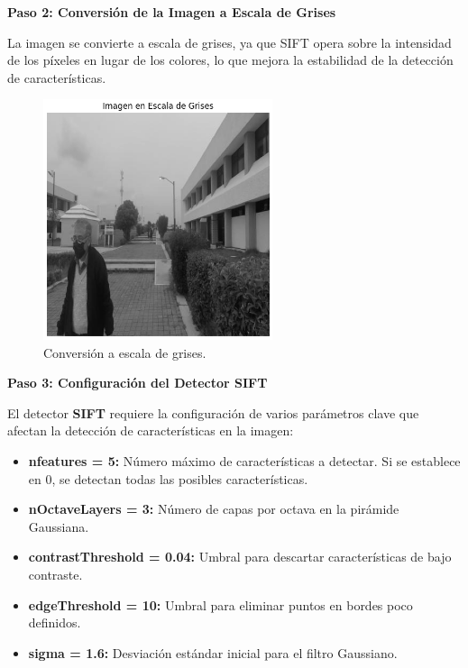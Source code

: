 \documentclass[a4paper]{article}
\begin{document}
\textbf{Paso 2: Conversión de la Imagen a Escala de Grises}

La imagen se convierte a escala de grises, ya que SIFT opera sobre la intensidad de los píxeles en lugar de los colores, lo que mejora la estabilidad de la detección de características.

\begin{figure}[H]
    \centering
    \includegraphics[width=0.6\textwidth]{images/sift_paso_2.png}
    \caption{Conversión a escala de grises.}
\end{figure}

\textbf{Paso 3: Configuración del Detector SIFT}
\par\vspace{0.5cm}

El detector \textbf{SIFT} requiere la configuración de varios parámetros clave que afectan la detección de características en la imagen:

\begin{itemize}
    \item \textbf{nfeatures = 5:} Número máximo de características a detectar. Si se establece en 0, se detectan todas las posibles características.
    \item \textbf{nOctaveLayers = 3:} Número de capas por octava en la pirámide Gaussiana.
    \item \textbf{contrastThreshold = 0.04:} Umbral para descartar características de bajo contraste.
    \item \textbf{edgeThreshold = 10:} Umbral para eliminar puntos en bordes poco definidos.
    \item \textbf{sigma = 1.6:} Desviación estándar inicial para el filtro Gaussiano.
\end{itemize}
\end{document}
